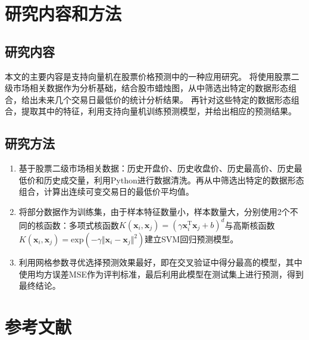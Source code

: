 \documentclass[a4paper,12pt]{Proposal}
\begin{document}
\section{研究内容和方法}
\subsection{研究内容}
本文的主要内容是支持向量机在股票价格预测中的一种应用研究。
将使用股票二级市场相关数据作为分析基础，结合股市蜡烛图，从中筛选出特定的数据形态组合，给出未来几个交易日最低价的统计分析结果。
再针对这些特定的数据形态组合，提取其中的特征，利用支持向量机训练预测模型，并给出相应的预测结果。
\subsection{研究方法}
\begin{enumerate}
    \item 基于股票二级市场相关数据：历史开盘价、历史收盘价、历史最高价、历史最低价和历史成交量，利用Python进行数据清洗。再从中筛选出特定的数据形态组合，计算出连续可变交易日的最低价平均值。
    \item 将部分数据作为训练集，由于样本特征数量小，样本数量大，分别使用2个不同的核函数：多项式核函数$K(\mathbf{x}_i,\mathbf{x}_j)=(\gamma\mathbf{x}_i^{\mathrm{T}}\mathbf{x}_j+b)^d$与高斯核函数$K(\mathbf{x}_i,\mathbf{x}_j)=\mathrm{exp}(-\gamma\Vert\mathbf{x}_i-\mathbf{x}_j\Vert^2)$建立SVM回归预测模型。
    \item 利用网格参数寻优选择预测效果最好，即在交叉验证中得分最高的模型，其中使用均方误差MSE作为评判标准，最后利用此模型在测试集上进行预测，得到最终结论。
\end{enumerate}
\section*{参考文献}

\vspace*{-3ex}


\end{document}
